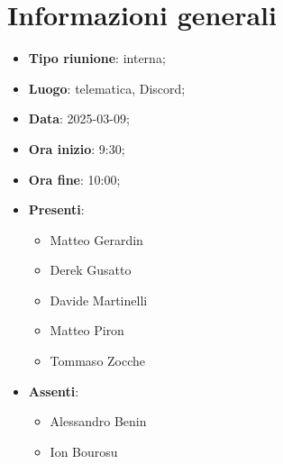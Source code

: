 \section{Informazioni generali}
\begin{itemize}
  \item \textbf{Tipo riunione}: interna;
  \item \textbf{Luogo}: telematica, Discord;
  \item \textbf{Data}: 2025-03-09;
  \item \textbf{Ora inizio}: 9:30;
  \item \textbf{Ora fine}: 10:00;
  
  \item \textbf{Presenti}:
  \begin{itemize}
    \item Matteo Gerardin
    \item Derek Gusatto
    \item Davide Martinelli
    \item Matteo Piron
    \item Tommaso Zocche
  \end{itemize}

  \item \textbf{Assenti}:
  \begin{itemize}
    \item Alessandro Benin
    \item Ion Bourosu
  \end{itemize}
 
\end{itemize}
